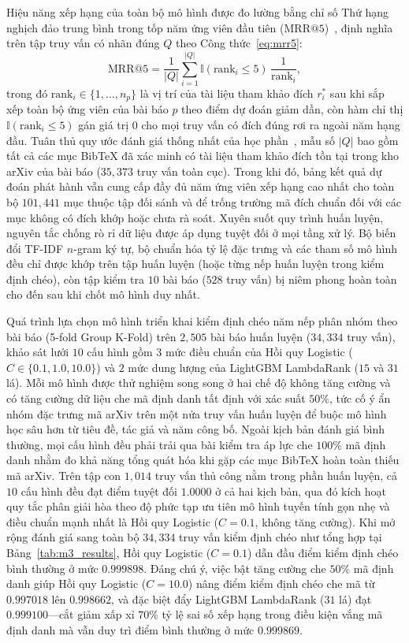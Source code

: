 Hiệu năng xếp hạng của toàn bộ mô hình được đo lường bằng chỉ số Thứ hạng nghịch đảo trung bình trong tốp năm ứng viên đầu tiên ($\text{MRR@5}$)~\cite{craswell2009}, định nghĩa trên tập truy vấn có nhãn đúng $Q$ theo Công thức~\eqref{eq:mrr5}:
\begin{equation}
    \text{MRR@5} = \frac{1}{|Q|} \sum_{i=1}^{|Q|} \mathbb{I}(\text{rank}_i \le 5)\,\frac{1}{\text{rank}_i},
    \label{eq:mrr5}
\end{equation}
trong đó $\text{rank}_i \in \{1, \dots, n_p\}$ là vị trí của tài liệu tham khảo đích $r^*_i$ sau khi sắp xếp toàn bộ ứng viên của bài báo $p$ theo điểm dự đoán giảm dần, còn hàm chỉ thị $\mathbb{I}(\text{rank}_i \le 5)$ gán giá trị $0$ cho mọi truy vấn có đích đúng rơi ra ngoài năm hạng đầu. Tuân thủ quy ước đánh giá thống nhất của học phần~\cite{hcmus_intro_ds}, mẫu số $|Q|$ bao gồm tất cả các mục BibTeX đã xác minh có tài liệu tham khảo đích tồn tại trong kho arXiv của bài báo ($35{,}373$ truy vấn toàn cục). Trong khi đó, bảng kết quả dự đoán phát hành vẫn cung cấp đầy đủ năm ứng viên xếp hạng cao nhất cho toàn bộ $101{,}441$ mục thuộc tập đối sánh và để trống trường mã đích chuẩn đối với các mục không có đích khớp hoặc chưa rà soát. Xuyên suốt quy trình huấn luyện, nguyên tắc chống rò rỉ dữ liệu được áp dụng tuyệt đối ở mọi tầng xử lý. Bộ biến đổi TF-IDF $n$-gram ký tự, bộ chuẩn hóa tỷ lệ đặc trưng và các tham số mô hình đều chỉ được khớp trên tập huấn luyện (hoặc từng nếp huấn luyện trong kiểm định chéo), còn tập kiểm tra $10$ bài báo ($528$ truy vấn) bị niêm phong hoàn toàn cho đến sau khi chốt mô hình duy nhất.

Quá trình lựa chọn mô hình triển khai kiểm định chéo năm nếp phân nhóm theo bài báo (5-fold Group K-Fold) trên $2{,}505$ bài báo huấn luyện ($34{,}334$ truy vấn), khảo sát lưới $10$ cấu hình gồm $3$ mức điều chuẩn của Hồi quy Logistic ($C \in \{0.1, 1.0, 10.0\}$) và $2$ mức dung lượng của LightGBM LambdaRank ($15$ và $31$ lá). Mỗi mô hình được thử nghiệm song song ở hai chế độ không tăng cường và có tăng cường dữ liệu che mã định danh tất định với xác suất $50\%$, tức cố ý ẩn nhóm đặc trưng mã arXiv trên một nửa truy vấn huấn luyện để buộc mô hình học sâu hơn từ tiêu đề, tác giả và năm công bố. Ngoài kịch bản đánh giá bình thường, mọi cấu hình đều phải trải qua bài kiểm tra áp lực che $100\%$ mã định danh nhằm đo khả năng tổng quát hóa khi gặp các mục BibTeX hoàn toàn thiếu mã arXiv. Trên tập con $1{,}014$ truy vấn thủ công nằm trong phần huấn luyện, cả $10$ cấu hình đều đạt điểm tuyệt đối $1.0000$ ở cả hai kịch bản, qua đó kích hoạt quy tắc phân giải hòa theo độ phức tạp ưu tiên mô hình tuyến tính gọn nhẹ và điều chuẩn mạnh nhất là Hồi quy Logistic ($C = 0.1$, không tăng cường). Khi mở rộng đánh giá sang toàn bộ $34{,}334$ truy vấn kiểm định chéo như tổng hợp tại Bảng~\ref{tab:m3_results}, Hồi quy Logistic ($C = 0.1$) dẫn đầu điểm kiểm định chéo bình thường ở mức $0.999898$. Đáng chú ý, việc bật tăng cường che $50\%$ mã định danh giúp Hồi quy Logistic ($C = 10.0$) nâng điểm kiểm định chéo che mã từ $0.997018$ lên $0.998662$, và đặc biệt đẩy LightGBM LambdaRank ($31$ lá) đạt $0.999100$---cắt giảm xấp xỉ $70\%$ tỷ lệ sai số xếp hạng trong điều kiện vắng mã định danh mà vẫn duy trì điểm bình thường ở mức $0.999869$.

